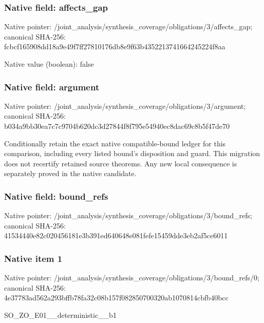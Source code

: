 \documentclass[10pt,a4paper]{article}
\begin{document}
\subsubsection{Native field: affects\_\allowbreak{}gap}
Native pointer: /joint\_\allowbreak{}analysis/synthesis\_\allowbreak{}coverage/obligations/3/affects\_\allowbreak{}gap; canonical SHA-256: fcbcf165908dd18a9e49f7ff27810176db8e9f63b4352213741664245224f8aa

Native value (boolean): false

\subsubsection{Native field: argument}
Native pointer: /joint\_\allowbreak{}analysis/synthesis\_\allowbreak{}coverage/obligations/3/argument; canonical SHA-256: b034a9bb30ea7c7c9704b620dc3d27844f8f795e54940ec8dac69c8b5f47de70

\begingroup\raggedright\sloppy Conditionally retain the exact native compatible-bound ledger for this comparison,\allowbreak{} including every listed bound's disposition and guard. This migration does not recertify retained source theorems. Any new local consequence is separately proved in the native candidate.\par\endgroup

\subsubsection{Native field: bound\_\allowbreak{}refs}
Native pointer: /joint\_\allowbreak{}analysis/synthesis\_\allowbreak{}coverage/obligations/3/bound\_\allowbreak{}refs; canonical SHA-256: 41534440e82c020456181e3b391ed640648e081fefe15459dde3eb2af5ce6011

\subsubsection{Native item 1}
Native pointer: /joint\_\allowbreak{}analysis/synthesis\_\allowbreak{}coverage/obligations/3/bound\_\allowbreak{}refs/0; canonical SHA-256: 4e37783ad562a293bffb78fa32c08b157f082850700320ab1070814cbfb40bcc

\begingroup\raggedright\sloppy SO\_\allowbreak{}ZO\_\allowbreak{}E01\_\allowbreak{}\_\allowbreak{}deterministic\_\allowbreak{}\_\allowbreak{}b1\par\endgroup
\end{document}
